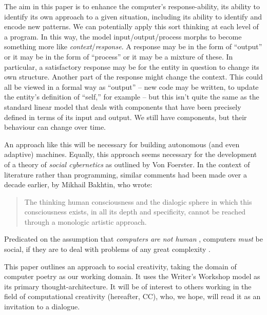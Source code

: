 The aim in this paper is to enhance the computer's response-ability,
its ability to identify its own approach to a given situation,
including its ability to identify and encode new patterns.  We can
potentially apply this sort thinking at each level of a program.  In
this way, the model input/output/process morphs to become something
more like \emph{context}/\emph{response}.  A response may be in the
form of ``output'' or it may be in the form of ``process'' or it may
be a mixture of these.  In particular, a satisfactory response may be
for the entity in question to change its own structure.  Another part
of the response might change the context.  This could all be viewed in
a formal way as ``output'' -- new code may be written, to update the
entity's definition of ``self,'' for example -- but this isn't quite
the same as the standard linear model that deals with components that
have been precisely defined in terms of its input and output.  We
still have components, but their behaviour can change over time.

An approach like this will be necessary for building autonomous (and
even adaptive) machines.  Equally, this approach seems necessary for
the development of a theory of \emph{social cybernetics} as outlined
by Von Foerster.  In the context of literature rather than
programming, similar comments had been made over a decade earlier, by
Mikhail Bakhtin, who wrote:
\begin{quote}
The thinking human consciousness and the dialogic sphere in which this
consciousness exists, in all its depth and specificity, cannot be
reached through a monologic artistic approach.\\ 
\end{quote}

Predicated on the assumption that \emph{computers are not human}
\citep[pp. 12, 18]{colton2012painting}, computers \emph{must} be
social, if they are to deal with problems of any great complexity
\citep{minsky1967programming,society-of-mind}.

This paper outlines an approach to social creativity, taking the
domain of computer poetry as our working domain.  It uses the Writer's
Workshop model \cite{gabriel2002writer} as its primary
thought-architecture.  It will be of interest to others working in the
field of computational creativity (hereafter, CC), who, we hope, will
read it as an invitation to a dialogue.


